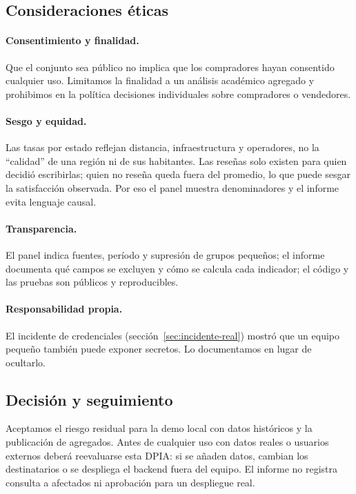 \subsection{Consideraciones éticas}
\paragraph{Consentimiento y finalidad.} Que el conjunto sea público no implica que los compradores hayan consentido cualquier uso. Limitamos la finalidad a un análisis académico agregado y prohibimos en la política decisiones individuales sobre compradores o vendedores.
\paragraph{Sesgo y equidad.} Las tasas por estado reflejan distancia, infraestructura y operadores, no la ``calidad'' de una región ni de sus habitantes. Las reseñas solo existen para quien decidió escribirlas; quien no reseña queda fuera del promedio, lo que puede sesgar la satisfacción observada. Por eso el panel muestra denominadores y el informe evita lenguaje causal.
\paragraph{Transparencia.} El panel indica fuentes, período y supresión de grupos pequeños; el informe documenta qué campos se excluyen y cómo se calcula cada indicador; el código y las pruebas son públicos y reproducibles.
\paragraph{Responsabilidad propia.} El incidente de credenciales (sección~\ref{sec:incidente-real}) mostró que un equipo pequeño también puede exponer secretos. Lo documentamos en lugar de ocultarlo.

\subsection{Decisión y seguimiento}
Aceptamos el riesgo residual para la demo local con datos históricos y la publicación de agregados. Antes de cualquier uso con datos reales o usuarios externos deberá reevaluarse esta DPIA: si se añaden datos, cambian los destinatarios o se despliega el backend fuera del equipo. El informe no registra consulta a afectados ni aprobación para un despliegue real.
